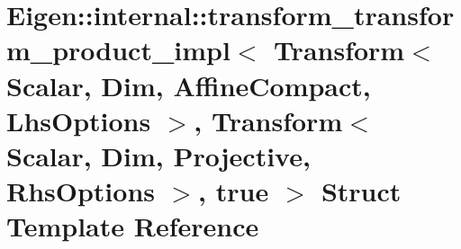 \hypertarget{struct_eigen_1_1internal_1_1transform__transform__product__impl_3_01_transform_3_01_scalar_00_013384ded452302af9ec99c76aff6d09ab}{}\section{Eigen\+:\+:internal\+:\+:transform\+\_\+transform\+\_\+product\+\_\+impl$<$ Transform$<$ Scalar, Dim, Affine\+Compact, Lhs\+Options $>$, Transform$<$ Scalar, Dim, Projective, Rhs\+Options $>$, true $>$ Struct Template Reference}
\label{struct_eigen_1_1internal_1_1transform__transform__product__impl_3_01_transform_3_01_scalar_00_013384ded452302af9ec99c76aff6d09ab}
